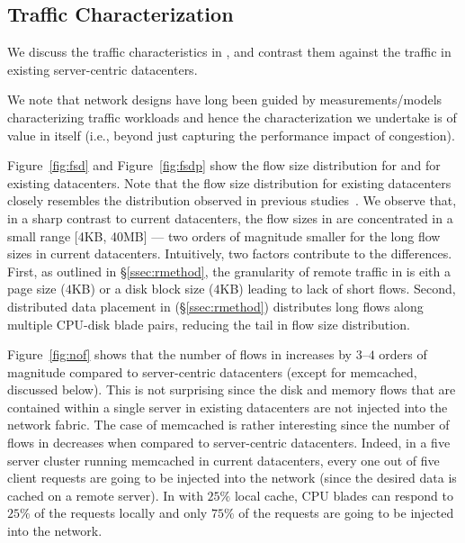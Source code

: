 \subsection{Traffic Characterization} 
\label{ssec:flc}
We discuss the traffic characteristics in \dis, and contrast them against the traffic in existing server-centric datacenters.

We note that network designs have long been guided by measurements/models characterizing traffic workloads and hence the characterization we undertake is of value in itself (i.e., beyond  just capturing the performance impact of congestion).

Figure~\ref{fig:fsd} and Figure~\ref{fig:fsdp} show the flow size distribution for \dis and for existing datacenters. Note that the flow size distribution for existing datacenters closely resembles the distribution observed in previous studies~\cite{srikanth, theo}. We observe that, in a sharp contrast to current datacenters, the flow sizes in \dis are concentrated in a small range [4KB, 40MB] --- two orders of magnitude smaller for the long flow sizes in current datacenters. Intuitively, two factors contribute to the differences. First, as outlined in \S\ref{ssec:rmethod}, the granularity of remote traffic in \dis is eith a page size ($4$KB) or a disk block size ($4$KB) leading to lack of short flows. Second, distributed data placement in \dis (\S\ref{ssec:rmethod}) distributes long flows along multiple CPU-disk blade pairs, reducing the tail in flow size distribution.

Figure~\ref{fig:nof} shows that the number of flows in \dis increases by $3$--$4$ orders of magnitude compared to server-centric datacenters (except for memcached, discussed below). This is not surprising since the disk and memory flows that are contained within a single server in existing datacenters are not injected into the network fabric. The case of memcached is rather interesting since the number of flows in \dis decreases when compared to server-centric datacenters. Indeed, in a five server cluster running memcached in current datacenters, every one out of five client requests are going to be injected into the network (since the desired data is cached on a remote server). In \dis with $25\%$ local cache, CPU blades can respond to $25\%$ of the requests locally and only $75\%$ of the requests are going to be injected into the network. 

